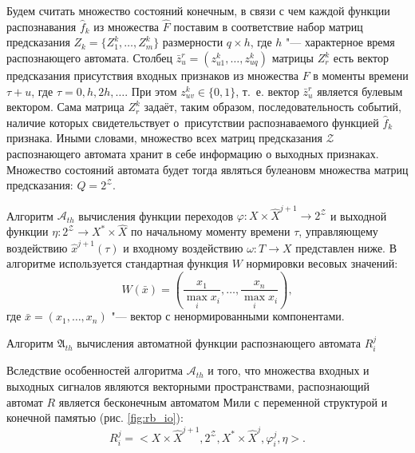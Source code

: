 \documentclass[a4paper, 12pt]{article}
\theoremstyle{plain}
\newcommand{\stretchsize}{2}
\renewcommand{\baselinestretch}{\stretchsize}
\begin{document}
	Будем считать множество состояний конечным, в связи с чем каждой функции распознавания $\hat f_k$ из множества $\hat F$ поставим в соответствие набор матриц предсказания $Z_k=\{Z_1^k,…,Z_m^k\}$ размерности $q\times h$, где $h$ "--- характерное время распознающего автомата. Столбец $\bar{z}_u^r=(z_{u1}^k,…,z_{uq}^k)$ матрицы $Z_r^k$ есть вектор предсказания присутствия входных признаков из множества $F$ в моменты времени $\tau+u$, где $\tau = 0,h,2h,\dots$. При этом $z_{uv}^k\in\{0,1\}$, т.~е. вектор $\bar{z}_u^r$ является булевым вектором. Сама матрица $Z_r^k$ задаёт, таким образом, последовательность событий, наличие которых свидетельствует о~присутствии распознаваемого функцией $\hat f_k$ признака. Иными словами, множество всех матриц предсказания $\mathcal Z$ распознающего автомата хранит в себе информацию о выходных признаках. Множество состояний автомата будет тогда являться булеановм множества матриц предсказания: $Q=2^{\mathcal Z}$.
	
	Алгоритм $\mathcal A_{th}$ вычисления функции переходов $\varphi:X\times\hat X^{j+1}\to 2^{\mathcal Z}$ и выходной функции $\eta:2^{\mathcal Z}\to X^*\times\hat X$ по начальному моменту времени $\tau$, управляющему воздействию $\hat x^{j+1}(\tau)$ и входному воздействию $\omega:T\to X$ представлен ниже. В алгоритме используется стандартная функция $W$ нормировки весовых значений:
	\begin{equation}
	W(\bar x)=\left(\frac{x_1}{\max\limits_i x_i},\dots,\frac{x_n}{\max\limits_i x_i}\right),
	\end{equation} 
	где $\bar x=(x_1,\dots,x_n)$ "--- вектор с ненормированными компонентами.

	\renewcommand{\baselinestretch}{1}
	\begin{algorithm}[h]
		\caption{Алгоритм $\mathfrak{A}_{th}$ вычисления автоматной функции распознающего автомата $R_i^j$}\label{alg:automato}
		\begin{algorithmic}[1]
			
			
		\end{algorithmic}
	\end{algorithm}
	\renewcommand{\baselinestretch}{\stretchsize}

	Вследствие особенностей алгоритма $\mathcal A_{th}$ и  того, что множества входных и выходных сигналов являются векторными пространствами, распознающий автомат $R$ является бесконечным автоматом Мили с переменной структурой и конечной памятью (рис. \ref{fig:rb_io}): 
	\begin{equation}
	R_i^j=<X\times\hat X^{j+1}, 2^{\mathcal Z}, X^*\times\hat X^j,\varphi_i^j,\eta>.
	\end{equation}
\end{document}
